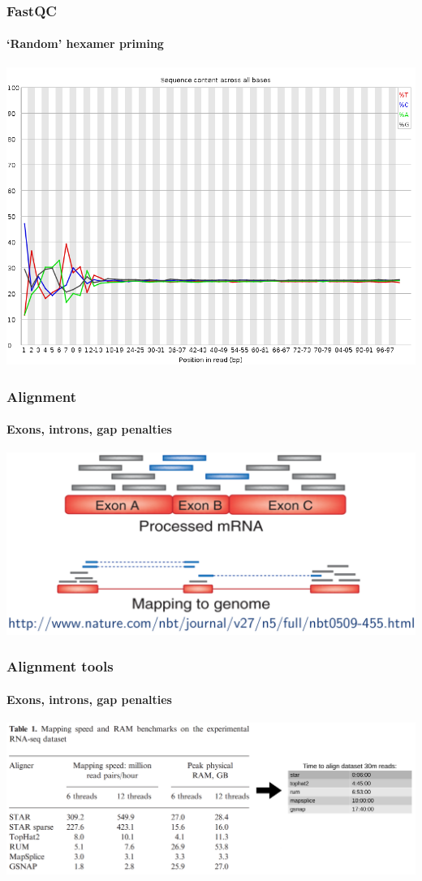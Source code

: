 \documentclass{beamer}			  %
\begin{document}
\begin{frame}
\frametitle{FastQC}
\framesubtitle{`Random' hexamer priming}
	\begin{center}
		\includegraphics[height=0.75\textheight]{figures/random_priming.png}
	\end{center}
	\cite{random_hexamer_priming}
\end{frame}

\begin{frame}
\frametitle{Alignment}
\framesubtitle{Exons, introns, gap penalties}
	\begin{center}
		\includegraphics[width=\textwidth]{figures/dge_05p.png}
	\end{center}
\end{frame}

\begin{frame}
\frametitle{Alignment tools}
\framesubtitle{Exons, introns, gap penalties}
	\begin{center}
		\includegraphics[width=\textwidth]{figures/dge_06p.png}\\\cite{star}
	\end{center}
\end{frame}
\end{document}
